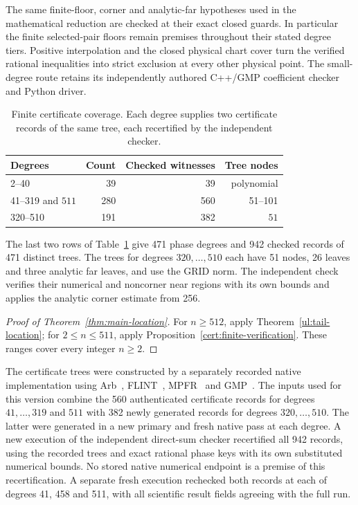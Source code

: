 The same finite-floor, corner and analytic-far hypotheses used in the
mathematical reduction are checked at their exact closed guards.
In particular the finite selected-pair floors remain premises throughout
their stated degree tiers. Positive interpolation and the closed physical
chart cover turn the verified rational inequalities into strict exclusion
at every other physical point. The small-degree route retains its
independently authored C++/GMP coefficient checker and Python driver.

\begin{table}[htbp]
\centering\small
\caption{Finite certificate coverage. Each degree supplies two
certificate records of the same tree, each recertified by the independent checker.}
\label{cert:coverage}
\begin{tabular}{@{}lrrr@{}}
\toprule
Degrees & Count & Checked witnesses & Tree nodes\\
\midrule
2--40 &39&39& polynomial\\
41--319 and $511$ &280&560&51--101\\
320--510 &191&382&$51$\\
\bottomrule
\end{tabular}
\end{table}

The last two rows of Table~\ref{cert:coverage} give 471 phase degrees
and 942 checked records of 471 distinct trees.
The trees for degrees $320,\ldots,510$ each have 51 nodes, 26 leaves
and three analytic far leaves, and use the GRID norm. The independent
check verifies their numerical and noncorner near regions with its own
bounds and applies the analytic corner estimate from 256.
\begin{proof}[Proof of Theorem~\ref{thm:main-location}]
For $n\geq512$, apply Theorem~\ref{ul:tail-location}; for
$2\leq n\leq511$, apply Proposition~\ref{cert:finite-verification}.
These ranges cover every integer $n\geq2$.
\end{proof}

The certificate trees were constructed by a separately recorded native
implementation using Arb~\cite{Johansson2017Arb}, FLINT~\cite{FLINT},
MPFR~\cite{Fousse2007MPFR} and GMP~\cite{GMP}.
The inputs used for this version combine the 560 authenticated certificate
records for degrees $41,\ldots,319$ and $511$ with 382 newly generated
records for degrees $320,\ldots,510$. The latter were generated in a new
primary and fresh native pass at each degree.
A new execution of the independent direct-sum checker recertified all
942 records, using the recorded trees and exact rational phase keys with
its own substituted numerical bounds. No stored native numerical endpoint
is a premise of this recertification. A separate fresh execution rechecked
both records at each of degrees 41, 458 and 511, with all scientific
result fields agreeing with the full run.

